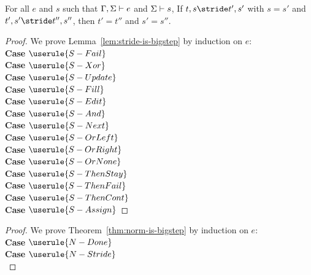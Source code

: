 \begin{lemma}
  For all $e$ and $s$ such that $\Gamma,\Sigma\vdash e$ and $\Sigma\vdash s$,
  If $t,s\stride t',s'$ with $s=s'$ and $t',s'\stride t'',s''$, then $t'=t''$
  and $s'=s''$.
  \label{lem:stride-is-bigstep}
\end{lemma}
\begin{proof}

  We prove Lemma~\ref{lem:stride-is-bigstep} by induction on $e$:\\

  \noindent\textbf{Case} $\userule{S-Fail}$ \\

  \noindent\textbf{Case} $\userule{S-Xor}$ \\

  \noindent\textbf{Case} $\userule{S-Update}$ \\

  \noindent\textbf{Case} $\userule{S-Fill}$ \\

  \noindent\textbf{Case} $\userule{S-Edit}$ \\

  \noindent\textbf{Case} $\userule{S-And}$ \\

  \noindent\textbf{Case} $\userule{S-Next}$ \\

  \noindent\textbf{Case} $\userule{S-OrLeft}$ \\

  \noindent\textbf{Case} $\userule{S-OrRight}$ \\

  \noindent\textbf{Case} $\userule{S-OrNone}$\\

  \noindent\textbf{Case} $\userule{S-ThenStay}$\\

  \noindent\textbf{Case} $\userule{S-ThenFail}$\\

  \noindent\textbf{Case} $\userule{S-ThenCont}$\\

  \noindent\textbf{Case} $\userule{S-Assign}$

\end{proof}

\begin{proof}

  We prove Theorem~\ref{thm:norm-is-bigstep} by induction on $e$:\\

  \noindent\textbf{Case} $\userule{N-Done}$ \\

  \noindent\textbf{Case} $\userule{N-Stride}$ \\

\end{proof}


